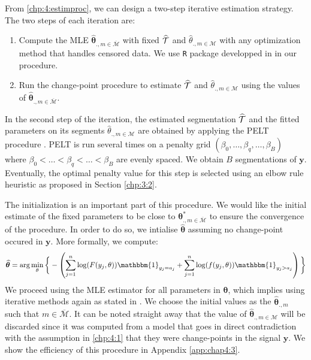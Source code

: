 From \ref{chp:4:estimproc}, we can design a two-step iterative estimation strategy. The two steps of each iteration are:
\begin{enumerate}
\item Compute the MLE $\widehat{\bm\theta}_{{.,m\in\overline{\mathcal{M}}}}$ with fixed $\widehat{{\mathcal T}}$ and $\widehat{\theta}_{.,m\in\mathcal{M}}$ with any optimization method that handles censored data. We use \texttt{R} package developped in \cite{delignette2015} in our procedure.  
\item Run the change-point procedure to estimate $\widehat{{\mathcal T}}$ and $\widehat{\theta}_{.,m\in\mathcal{M}}$ using the values of $\widehat{\bm\theta}_{{.,m\in\overline{\mathcal{M}}}}$.
\end{enumerate} 

In the second step of the iteration, the estimated segmentation $\widehat{{\mathcal T}}$ and the fitted parameters on its segments $\widehat{\theta}_{.,m\in\mathcal{M}}$ are obtained by applying the PELT procedure \citep{Killick2012}. PELT is run several times on a penalty grid $(\beta_0,\dots,\beta_q,\dots,\beta_{B})$ where $\beta_0<\dots<\beta_{q}<\dots<\beta_{B}$ are evenly spaced. We obtain $B$ segmentations of $\bm{y}$. Eventually, the optimal penalty value for this step is selected using an elbow rule heuristic as proposed in Section \ref{chp:3:2}.

The initialization is an important part of this procedure. We would like the initial estimate of the fixed parameters to be close to $\bm\theta^*_{{.,m\in\overline{\mathcal{M}}}}$ to ensure the convergence of the procedure. In order to do so, we intialise $\widehat{\bm\theta}$ assuming no change-point occured in $\bm y$.  More formally, we compute: 
\begin{equation}\label{chp:4:init}
\widehat{\bm\theta} = \arg\min_{\theta}\bigg\{ - \left(\sum_{j=1}^{n}\log(F(y_j,\theta))\mathbbm{1}_{y_j=a_j}+\sum_{j=1}^{n}\log(f(y_j,\theta))\mathbbm{1}_{y_j>a_j}\right)\bigg\}
\end{equation}   
We proceed using the MLE estimator for all parameters in $\bm \theta$, which implies using iterative methods again as stated in \cite{cohen1965maximum}. We choose the initial values as the $\widehat{\bm\theta}_{.,m}$ such that $m\in\overline{\mathcal{M}}$. It can be noted straight away that the value of $\widehat{\bm\theta}_{.,m\in\mathcal{M}}$ will be discarded since it was computed from a model that goes in direct contradiction with the assumption in \ref{chp:4:1} that they were change-points in the signal $\bm y$. We show the efficiency of this procedure in Appendix \ref{app:chap4:3}.  

